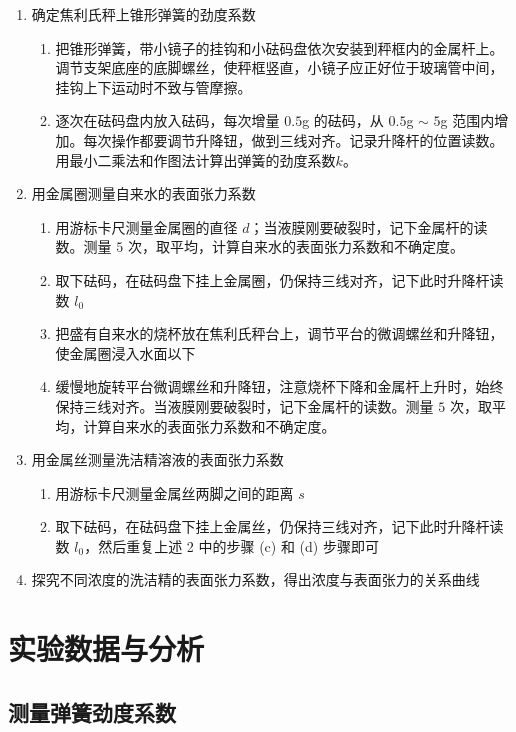 \documentclass[10pt,a4paper]{article}	%
\begin{document}
	\begin{enumerate}
		\item 确定焦利氏秤上锥形弹簧的劲度系数\begin{enumerate}
			\item 把锥形弹簧，带小镜子的挂钩和小砝码盘依次安装到秤框内的金属杆上。调节支架底座的底脚螺丝，使秤框竖直，小镜子应正好位于玻璃管中间，挂钩上下运动时不致与管摩擦。
			\item 逐次在砝码盘内放入砝码，每次增量 $0.5$g 的砝码，从 $0.5$g $\sim$ $5$g 范围内增加。每次操作都要调节升降钮，做到三线对齐。记录升降杆的位置读数。用最小二乘法和作图法计算出弹簧的劲度系数$k$。
		\end{enumerate}
		\item 用金属圈测量自来水的表面张力系数\begin{enumerate}
			\item 用游标卡尺测量金属圈的直径 $d$；当液膜刚要破裂时，记下金属杆的读数。测量 $5$ 次，取平均，计算自来水的表面张力系数和不确定度。
			\item 取下砝码，在砝码盘下挂上金属圈，仍保持三线对齐，记下此时升降杆读数 $l_0$
			\item 把盛有自来水的烧杯放在焦利氏秤台上，调节平台的微调螺丝和升降钮，使金属圈浸入水面以下
			\item 缓慢地旋转平台微调螺丝和升降钮，注意烧杯下降和金属杆上升时，始终保持三线对齐。当液膜刚要破裂时，记下金属杆的读数。测量 $5$ 次，取平均，计算自来水的表面张力系数和不确定度。
		\end{enumerate}
		\item 用金属丝测量洗洁精溶液的表面张力系数\begin{enumerate}
			\item 用游标卡尺测量金属丝两脚之间的距离 $s$
			\item 取下砝码，在砝码盘下挂上金属丝，仍保持三线对齐，记下此时升降杆读数 $l_0$，然后重复上述 2 中的步骤 (c) 和 (d) 步骤即可
		\end{enumerate}
		\item 探究不同浓度的洗洁精的表面张力系数，得出浓度与表面张力的关系曲线
	\end{enumerate}

	\section{实验数据与分析}
	\subsection{测量弹簧劲度系数}
\end{document}
